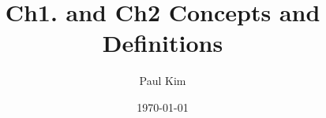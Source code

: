 \documentclass[12pt]{article}
\begin{document}
	
\title{Ch1. and Ch2 Concepts and Definitions}
\author{Paul Kim}
\date{\today}
\maketitle
\end{document}
